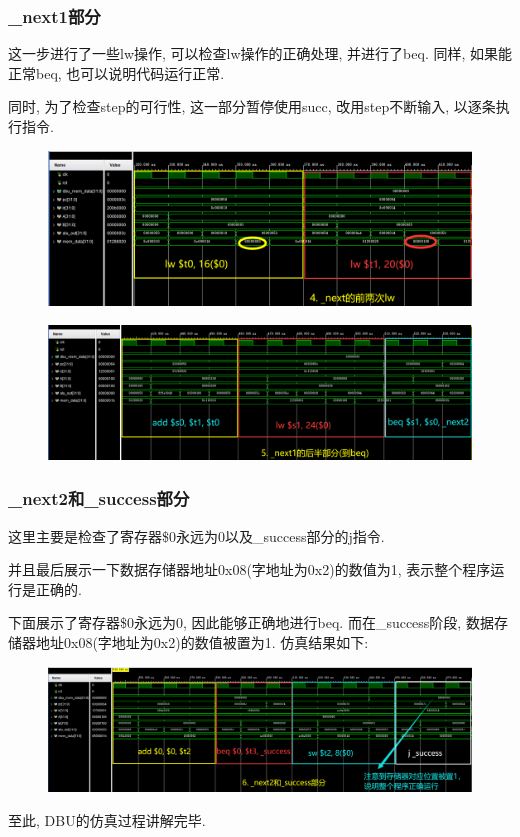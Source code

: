 \documentclass[UTF8]{article}
\begin{document}
\subsubsection{\_next1部分}
这一步进行了一些lw操作, 可以检查lw操作的正确处理, 并进行了beq. 同样, 如果能正常beq, 也可以说明代码运行正常.\par
同时, 为了检查step的可行性, 这一部分暂停使用succ, 改用step不断输入, 以逐条执行指令.
\begin{figure}[H]
	\centering
	\includegraphics[width=\linewidth]{CPU_5_next1_lw.png}
\end{figure}
\begin{figure}[H]
	\centering
	\includegraphics[width=\linewidth]{CPU_6_next1_beq.png}
\end{figure}
\subsubsection{\_next2和\_success部分}
这里主要是检查了寄存器\$0永远为0以及\_success部分的j指令.\par
并且最后展示一下数据存储器地址0x08(字地址为0x2)的数值为1, 表示整个程序运行是正确的.\par
下面展示了寄存器\$0永远为0, 因此能够正确地进行beq. 而在\_success阶段, 数据存储器地址0x08(字地址为0x2)的数值被置为1. 仿真结果如下:
\begin{figure}[H]
	\centering
	\includegraphics[width=\linewidth]{CPU_7_final.png}
\end{figure}
至此, DBU的仿真过程讲解完毕.
\end{document}
